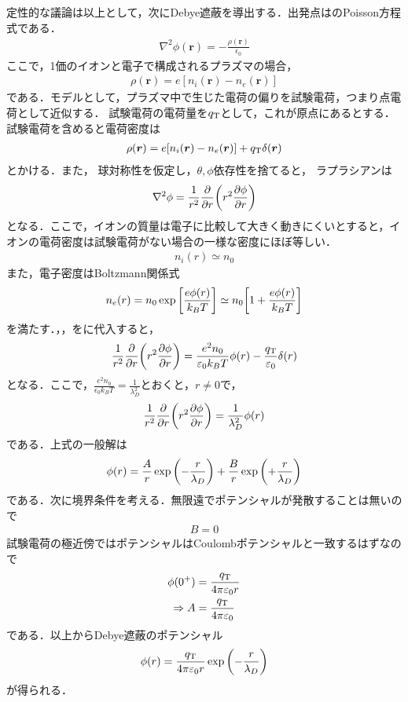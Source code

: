 \documentclass{report}
\begin{document}
定性的な議論は以上として，次にDebye遮蔽を導出する．出発点はのPoisson方程式である．
\begin{align}
  \nabla^2 \phi(\bm{r}) = -\frac{\rho(\bm{r})}{\epsilon_0} \label{poisson-eq}
\end{align}
ここで，1価のイオンと電子で構成されるプラズマの場合，
\begin{align}
  \rho(\bm{r}) = e[n_i(\bm{r}) - n_e(\bm{r})]
\end{align}
である．モデルとして，プラズマ中で生じた電荷の偏りを試験電荷，つまり点電荷として近似する．
試験電荷の電荷量を$q_{\mathrm{T}}$として，これが原点にあるとする．
試験電荷を含めると電荷密度は
\begin{align}
  \rho(\bm{r}) = e[n_i(\bm{r}) - n_e(\bm{r})] + q_{\mathrm{T}}\delta(\bm{r}) \label{density-charge}
\end{align}
とかける．また，
球対称性を仮定し，$\theta,\phi$依存性を捨てると，
ラプラシアンは
\begin{align}
  \nabla^2\phi = \frac{1}{r^2} \frac{\partial}{\partial r} \qty(r^2 \frac{\partial \phi}{\partial r})
\end{align}
となる．ここで，イオンの質量は電子に比較して大きく動きにくいとすると，イオンの電荷密度は試験電荷がない場合の一様な密度にほぼ等しい．
\begin{align}
  n_i(r) \simeq n_0 \label{density-ion}
\end{align}
また，電子密度はBoltzmann関係式
\begin{align}
  n_e(r) = n_0\exp\qty[\frac{e\phi(r)}{k_B T}] \simeq n_0\qty[1 + \frac{e\phi(r)}{k_B T}] \label{density-e}
\end{align}
を満たす．，，をに代入すると，
\begin{align}
  \frac{1}{r^2}\frac{\partial}{\partial r}\qty(r^2\frac{\partial \phi}{\partial r}) = \frac{e^2 n_0}{\varepsilon_0 k_B T}\phi(r) - \frac{q_{\mathrm{T}}}{\varepsilon_0}\delta(r)
\end{align}
となる．ここで，$\frac{e^2 n_0}{\epsilon_0 k_B T} = \frac{1}{\lambda_D^2}$とおくと，$r\neq0$で，
\begin{align}
  \frac{1}{r^2}\frac{\partial}{\partial r}\qty(r^2\frac{\partial \phi}{\partial r}) = \frac{1}{\lambda_D^2}\phi(r)
\end{align}
である．上式の一般解は
\begin{align}
  \phi(r) = \frac{A}{r}\exp\qty(-\frac{r}{\lambda_D}) + \frac{B}{r}\exp\qty(+\frac{r}{\lambda_D})
\end{align}
である．次に境界条件を考える．無限遠でポテンシャルが発散することは無いので
\begin{align}
  B=0
\end{align}
試験電荷の極近傍ではポテンシャルはCoulombポテンシャルと一致するはずなので
\begin{align}
  \phi(0^{+}) &= \frac{q_{\mathrm{T}}}{4\pi\varepsilon_0 r}\\
  \Rightarrow A&= \frac{q_{\mathrm{T}}}{4\pi\varepsilon_0}
\end{align}
である．以上からDebye遮蔽のポテンシャル
\begin{align}
  \phi(r) = \frac{q_{\mathrm{T}}}{4\pi\varepsilon_0 r}\exp\qty(-\frac{r}{\lambda_D})
\end{align}
が得られる．
\end{document}
